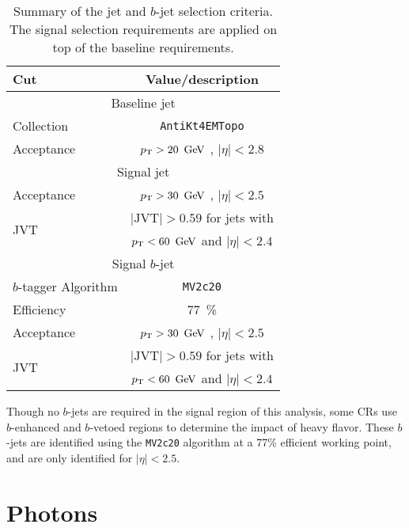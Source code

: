 \begin{table}[bh!]
\begin{center}
    \begin{tabular}{l|c}
      \hline
      Cut            & Value/description \\
      \hline
      \hline
      \multicolumn{2}{c}{Baseline jet} \\
      \hline
      Collection     & \texttt{AntiKt4EMTopo} \\
      Acceptance     & $\pt > 20\,\GeV$ , $|\eta |<2.8$ \\
      \hline
      \multicolumn{2}{c}{Signal jet} \\
      \hline
      Acceptance     & $\pt > 30\,\GeV$ , $|\eta | < 2.5$ \\ 
      \multirow{2}{*}{JVT}      & $|\mathrm{JVT}|>0.59$ for jets with \\
                                & $\pt <60\,\GeV$ and $|\eta | < 2.4$ \\
      \hline
      \multicolumn{2}{c}{Signal $b$-jet} \\
      \hline 
      $b$-tagger Algorithm      & \texttt{MV2c20} \\
      Efficiency                & $77$~\% \\
      Acceptance                & $\pt > 30\,\GeV$ , $|\eta | < 2.5$ \\ 
      \multirow{2}{*}{JVT}      & $|\mathrm{JVT}|>0.59$ for jets with \\
                                & $\pt <60\,\GeV$ and $|\eta | < 2.4$ \\
      \hline
      \hline
\end{tabular}
\end{center}
\caption{Summary of the jet and $b$-jet selection criteria. The signal selection
  requirements are applied on top of the baseline requirements. }
\label{tab:jetsdef}
\end{table}

Though no $b$-jets are required in the signal region of this analysis, some \acp{CR} use $b$-enhanced and $b$-vetoed regions to determine the impact of heavy flavor. These $b$-jets are identified using the \texttt{MV2c20} algorithm at a 77\% efficient working point, and are only identified for $|\eta|<2.5$. 



\section{Photons}
